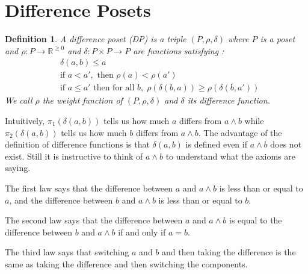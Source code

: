\documentclass[acmsmall,review,anonymous]{acmart}\settopmatter{printfolios=true,printccs=false,printacmref=false}
\newtheorem{definition}{Definition}
\begin{document}
\section{Difference Posets}
\begin{definition}
A {\em difference poset (DP)} is a triple $(P, \rho, \delta)$ where $P$ is
a poset and $\rho : P \longrightarrow \mathbb{R}^{\geq 0}$ and $\delta : P
\times P \longrightarrow P$ are functions satisfying :
\begin{align}
&\delta(a, b) \leq a\tag{A1}\\
&\text{if } a < a',\text{ then } \rho(a) < \rho(a') \tag{A2}\\
&\text{if } a \leq a' \text{ then for all }b , \; \rho(\delta(b, a)) \geq
\rho(\delta(b, a'))\tag{A3}
\end{align}
We call $\rho$ the weight function of $(P, \rho, \delta)$ and $\delta$ its
difference function.
\end{definition}
\iffalse
Intuitively, $\pi_1(\delta(a, b))$ tells us how much $a$ differs from $a \wedge
b$ while $\pi_2(\delta(a, b))$ tells us how much $b$ differs from $a \wedge b$.
The advantage of the definition of difference functions is that $\delta(a, b)$
is defined even if $a \wedge b$ does not exist. Still it is instructive to
think of $a \wedge b$ to understand what the axioms are saying.

The first law says that the difference between $a$ and $a \wedge b$ is less
than or equal to $a$, and the difference between $b$ and $a \wedge b$
is less than or equal to $b$.

The second law says that the difference between $a$ and $a \wedge b$ is equal
to the difference between $b$ and $a \wedge b$ if and only if $a = b$.

The third law says that switching $a$ and $b$ and then taking the difference
is the same as taking the difference and then switching the components.
\end{document}
